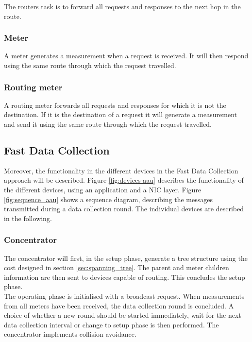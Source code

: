 The routers task is to forward all requests and responses to the next hop in the route.

\subsubsection{Meter}

A meter generates a measurement when a request is received. It will then respond using the same route through which the request travelled.

\subsubsection{Routing meter}

A routing meter forwards all requests and responses for which it is not the destination. If it is the destination of a request it will generate a measurement and send it using the same route through which the request travelled.

\subsection{Fast Data Collection}
Moreover, the functionality in the different devices in the Fast Data Collection approach will be described. Figure \ref{fig:devices-aau} describes the functionality of the different devices, using an application and a NIC layer. Figure \ref{fig:sequence_aau} shows a sequence diagram, describing the messages transmitted during a data collection round. The individual devices are described in the following.



\subsubsection{Concentrator}

The concentrator will first, in the setup phase, generate a tree structure using the cost designed in section \ref{sec:spanning_tree}. The parent and meter children information are then sent to devices capable of routing. This concludes the setup phase.\\
The operating phase is initialised with a broadcast request. When measurements from all meters have been received, the data collection round is concluded. A choice of whether a new round should be started immediately, wait for the next data collection interval or change to setup phase is then performed. The concentrator implements collision avoidance.

